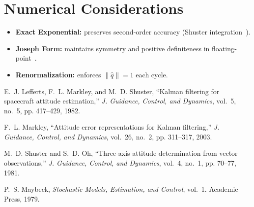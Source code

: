 \documentclass[12pt,letterpaper]{article}
\begin{document}
\section{Numerical Considerations}
\begin{itemize}
  \item \textbf{Exact Exponential:} preserves second‐order accuracy (Shuster integration~\cite{Shuster1981}).
  \item \textbf{Joseph Form:} maintains symmetry and positive definiteness in floating‐point~\cite{Maybeck1979}.
  \item \textbf{Renormalization:} enforces $\|\hat q\|=1$ each cycle.
\end{itemize}

\begin{thebibliography}{9}
E.~J. Lefferts, F.~L. Markley, and M.~D. Shuster, “Kalman filtering for spacecraft attitude estimation,” \emph{J. Guidance, Control, and Dynamics}, vol.~5, no.~5, pp. 417–429, 1982.

F.~L. Markley, “Attitude error representations for Kalman filtering,” \emph{J. Guidance, Control, and Dynamics}, vol.~26, no.~2, pp. 311–317, 2003.

M.~D. Shuster and S.~D. Oh, “Three‐axis attitude determination from vector observations,” \emph{J. Guidance, Control, and Dynamics}, vol.~4, no.~1, pp. 70–77, 1981.

P.~S. Maybeck, \emph{Stochastic Models, Estimation, and Control}, vol.~1. Academic Press, 1979.

\end{thebibliography}
\end{document}
